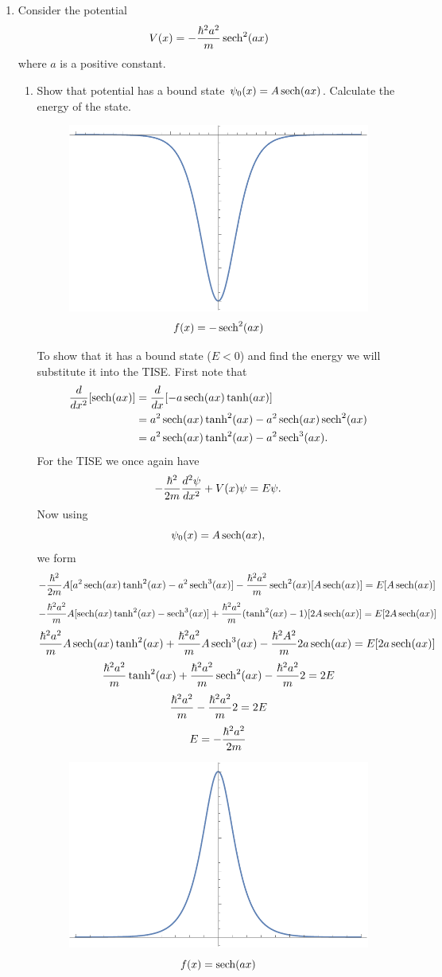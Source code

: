 \documentclass[11pt,letterpaper]{article}
\begin{document}
\begin{enumerate}
\item
Consider the potential
$$V(x) = -\frac{\hbar^2a^2}{m}\operatorname{sech}^2(ax)$$
where $a$ is a positive constant.
\begin{enumerate}
\item
Show that potential has a bound state $\psi_0(x) = A\operatorname{sech}(ax)$. Calculate the energy of the state.
\begin{figure}[H]
\centering
\includegraphics[width=100mm]{HW3_7a.pdf}
$$f(x) = -\operatorname{sech}^2(ax)$$
\end{figure}
To show that it has a bound state ($E<0$) and find the energy we will substitute it into the TISE. First note that
\begin{align*}\frac{d}{dx^2}[\operatorname{sech}(ax)]  &= \frac{d}{dx}[-a\operatorname{sech}(ax)\tanh(ax)]\\
&=a^2\operatorname{sech}(ax)\tanh^2(ax)-a^2\operatorname{sech}(ax)\operatorname{sech}^2(ax)\\
&=a^2\operatorname{sech}(ax)\tanh^2(ax)-a^2\operatorname{sech}^3(ax).
\end{align*}
For the TISE we once again have
$$-\frac{\hbar^2}{2m}\frac{d^2\psi}{dx^2}+V(x)\psi = E\psi.$$
Now using
$$\psi_0(x) = A\operatorname{sech}(ax),$$ we form
$$-\frac{\hbar^2}{2m}A[a^2\operatorname{sech}(ax)\tanh^2(ax)-a^2\operatorname{sech}^3(ax)]-\frac{\hbar^2a^2}{m}\operatorname{sech}^2(ax)[A\operatorname{sech}(ax)] = E[A\operatorname{sech}(ax)] $$
$$-\frac{\hbar^2a^2}{m}A[\operatorname{sech}(ax)\tanh^2(ax)-\operatorname{sech}^3(ax)]+\frac{\hbar^2a^2}{m}(\tanh^2(ax)-1)[2A\operatorname{sech}(ax)] = E[2A\operatorname{sech}(ax)] $$
$$\frac{\hbar^2a^2}{m}A\operatorname{sech}(ax)\tanh^2(ax)+\frac{\hbar^2a^2}{m}A\operatorname{sech}^3(ax)-\frac{\hbar^2A^2}{m}2a\operatorname{sech}(ax) = E[2a\operatorname{sech}(ax)]$$
$$\frac{\hbar^2a^2}{m}\tanh^2(ax)+\frac{\hbar^2a^2}{m}\operatorname{sech}^2(ax)-\frac{\hbar^2a^2}{m}2 = 2E$$
$$\frac{\hbar^2a^2}{m}-\frac{\hbar^2a^2}{m}2 = 2E$$
$$E = -\frac{\hbar^2a^2}{2m}$$
\begin{figure}[H]
\centering
\includegraphics[width=100mm]{HW3_7a1.pdf}
$$f(x) = \operatorname{sech}(ax)$$
\end{figure}


\end{enumerate}
\end{enumerate}
\end{document}
